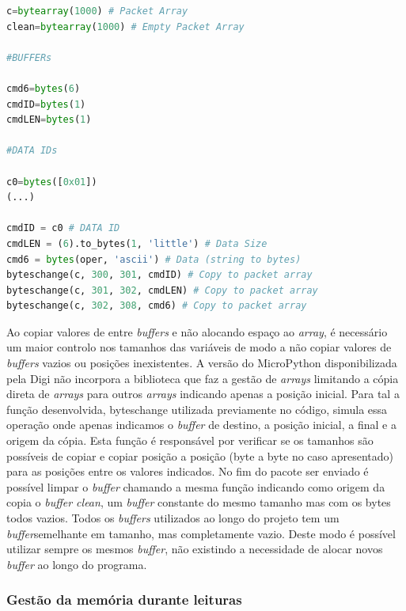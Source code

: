 \begin{lstlisting}[caption=Exemplo com a concatenação da operadora,label={py1},language=Python]
c=bytearray(1000) # Packet Array
clean=bytearray(1000) # Empty Packet Array 
 
#BUFFERs

cmd6=bytes(6)
cmdID=bytes(1)
cmdLEN=bytes(1)
 
#DATA IDs

c0=bytes([0x01])
(...) 

cmdID = c0 # DATA ID
cmdLEN = (6).to_bytes(1, 'little') # Data Size
cmd6 = bytes(oper, 'ascii') # Data (string to bytes)
byteschange(c, 300, 301, cmdID) # Copy to packet array 
byteschange(c, 301, 302, cmdLEN) # Copy to packet array 
byteschange(c, 302, 308, cmd6) # Copy to packet array 
\end{lstlisting}

\par Ao copiar valores de entre \textit{buffers} e não alocando espaço ao \textit{array}, é necessário um maior controlo nos tamanhos das variáveis de modo a não copiar valores de \textit{buffers} vazios ou posições inexistentes. A versão do MicroPython disponibilizada pela Digi não incorpora a biblioteca que faz a gestão de \textit{arrays} limitando a cópia direta de \textit{arrays} para outros \textit{arrays} indicando apenas a posição inicial. Para tal a função desenvolvida, byteschange utilizada previamente no código, simula essa operação onde apenas indicamos o \textit{buffer} de destino, a posição inicial, a final e a origem da cópia. Esta função é responsável por verificar se os tamanhos são possíveis de copiar e copiar posição a posição (byte a byte no caso apresentado) para as posições entre os valores indicados. No fim do pacote ser enviado é possível limpar o \textit{buffer} chamando a mesma função indicando como origem da copia o \textit{buffer clean}, um \textit{buffer} constante do mesmo tamanho mas com os bytes todos vazios. Todos os \textit{buffers} utilizados ao longo do projeto tem um \textit{buffer}semelhante em tamanho, mas completamente vazio. Deste modo é possível utilizar sempre os mesmos \textit{buffer}, não existindo a necessidade de alocar novos \textit{buffer} ao longo do programa.

\subsubsection {Gestão da memória durante leituras}

